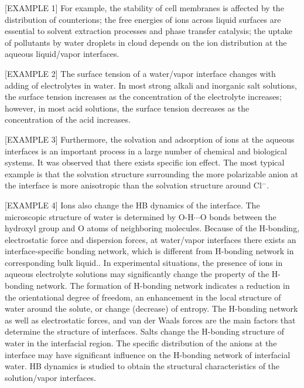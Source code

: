 [EXAMPLE 1]
For example, the stability of cell membranes is affected by the distribution of counterions\cite{Veziriglu1990}; 
the free energies of ions across liquid surfaces are essential to solvent extraction processes and phase transfer catalysis\cite{Starks1994};
the uptake of pollutants by water droplets in cloud depends on the ion distribution at the aqueous liquid/vapor interfaces.
%

[EXAMPLE 2]
The surface tension of a water/vapor interface changes with adding of electrolytes in water\cite{Pegram2006}.
In most strong alkali and inorganic salt solutions, the surface tension increases as the concentration of the electrolyte increases; 
however, in most acid solutions, the surface tension decreases as the concentration of the acid increases.
%

[EXAMPLE 3]
Furthermore, the solvation and adsorption of ions at the aqueous interfaces is an important process in a large number of chemical and biological systems\cite{Chang06}.
It was observed that there exists specific ion effect. 
The most typical example is that the solvation structure surrounding the more polarizable \I anion at the interface is more anisotropic than the solvation structure around Cl$^-$.
%

[EXAMPLE 4]
Ions also change the HB dynamics of the interface.
The microscopic structure of water is determined by O-H$\cdots$O bonds between the hydroxyl group 
and O atoms of neighboring molecules. 
Because of the H-bonding, electrostatic force and dispersion forces, 
at water/vapor interfaces there exists an interface-specific bonding network, 
which is different from H-bonding network in corresponding bulk liquid.\cite{Allongue96,Velasco-Velez14}.
In experimental situations, the presence of ions in aqueous 
electrolyte solutions may significantly change the property of the H-bonding network. 
The formation of H-bonding network indicates a reduction in the orientational degree of freedom, 
an enhancement in the local structure of water around the solute, or change (decrease) of entropy\cite{Frank45a, Frank45b,Frank45c}.
%
The H-bonding network\cite{Eisenberg1969,Speedy1976,Poole1994,Soper2008b,Ball2001,Nilsson2011,Pettersson2015} as well as electrostatic forces, 
and van der Waals forces are the main factors that determine the structure of interfaces. 
Salts change the H-bonding structure of water in the interfacial region\cite{EAR04,McLain2006,Ball2008}. 
The specific distribution of the anions at the interface may have significant influence on the H-bonding network of interfacial water\cite{Morita2008}.
HB dynamics is studied to obtain the structural characteristics of the solution/vapor interfaces.

